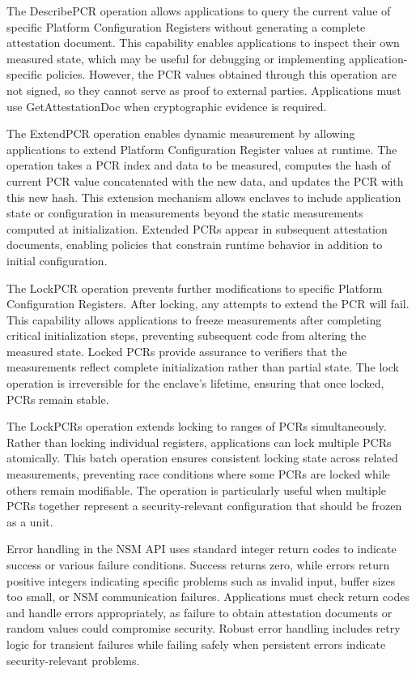 The DescribePCR operation allows applications to query the current value of specific Platform Configuration Registers without generating a complete attestation document. This capability enables applications to inspect their own measured state, which may be useful for debugging or implementing application-specific policies. However, the PCR values obtained through this operation are not signed, so they cannot serve as proof to external parties. Applications must use GetAttestationDoc when cryptographic evidence is required.

The ExtendPCR operation enables dynamic measurement by allowing applications to extend Platform Configuration Register values at runtime. The operation takes a PCR index and data to be measured, computes the hash of current PCR value concatenated with the new data, and updates the PCR with this new hash. This extension mechanism allows enclaves to include application state or configuration in measurements beyond the static measurements computed at initialization. Extended PCRs appear in subsequent attestation documents, enabling policies that constrain runtime behavior in addition to initial configuration.

The LockPCR operation prevents further modifications to specific Platform Configuration Registers. After locking, any attempts to extend the PCR will fail. This capability allows applications to freeze measurements after completing critical initialization steps, preventing subsequent code from altering the measured state. Locked PCRs provide assurance to verifiers that the measurements reflect complete initialization rather than partial state. The lock operation is irreversible for the enclave's lifetime, ensuring that once locked, PCRs remain stable.

The LockPCRs operation extends locking to ranges of PCRs simultaneously. Rather than locking individual registers, applications can lock multiple PCRs atomically. This batch operation ensures consistent locking state across related measurements, preventing race conditions where some PCRs are locked while others remain modifiable. The operation is particularly useful when multiple PCRs together represent a security-relevant configuration that should be frozen as a unit.

Error handling in the NSM API uses standard integer return codes to indicate success or various failure conditions. Success returns zero, while errors return positive integers indicating specific problems such as invalid input, buffer sizes too small, or NSM communication failures. Applications must check return codes and handle errors appropriately, as failure to obtain attestation documents or random values could compromise security. Robust error handling includes retry logic for transient failures while failing safely when persistent errors indicate security-relevant problems.

